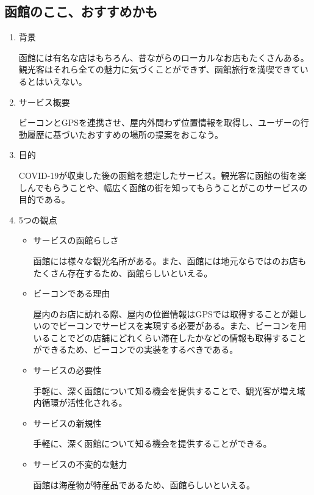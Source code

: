 \subsection{函館のここ、おすすめかも}
\begin{enumerate}
    \item 背景
    \par 函館には有名な店はもちろん、昔ながらのローカルなお店もたくさんある。観光客はそれら全ての魅力に気づくことができず、函館旅行を満喫できているとはいえない。
    \item サービス概要
    \par ビーコンとGPSを連携させ、屋内外問わず位置情報を取得し、ユーザーの行動履歴に基づいたおすすめの場所の提案をおこなう。
    \item 目的
    \par COVID-19が収束した後の函館を想定したサービス。観光客に函館の街を楽しんでもらうことや、幅広く函館の街を知ってもらうことがこのサービスの目的である。
    \item 5つの観点
    \begin{itemize}
        \item サービスの函館らしさ
        \par 函館には様々な観光名所がある。また、函館には地元ならではのお店もたくさん存在するため、函館らしいといえる。
        \item ビーコンである理由
        \par 屋内のお店に訪れる際、屋内の位置情報はGPSでは取得することが難しいのでビーコンでサービスを実現する必要がある。また、ビーコンを用いることでどの店舗にどれくらい滞在したかなどの情報も取得することができるため、ビーコンでの実装をするべきである。
        \item サービスの必要性
        \par 手軽に、深く函館について知る機会を提供することで、観光客が増え域内循環が活性化される。
        \item サービスの新規性
        \par 手軽に、深く函館について知る機会を提供することができる。
        \item サービスの不変的な魅力
        \par 函館は海産物が特産品であるため、函館らしいといえる。
    \end{itemize}
\end{enumerate}

